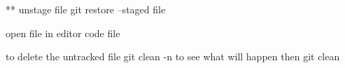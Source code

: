 ** unstage file 
git restore --staged file 


open file in editor
  code file 

to delete the untracked file 
git clean -n  to see what will happen 
then 
git clean 